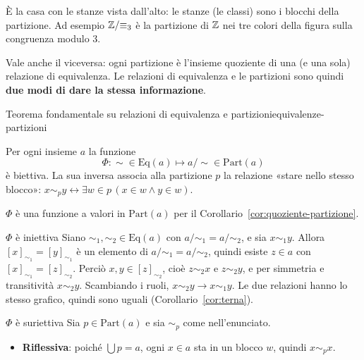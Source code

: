 \begin{spiegazione}
    È la casa con le stanze vista dall'alto: le stanze (le classi) sono i blocchi della partizione. Ad esempio $\mathbb{Z}/{\equiv_3}$
    è la partizione di $\mathbb{Z}$ nei tre colori della figura sulla congruenza modulo $3$.
\end{spiegazione}

Vale anche il viceversa: ogni partizione è l'insieme quoziente di una (e una sola) relazione di equivalenza. Le relazioni di
equivalenza e le partizioni sono quindi \textbf{due modi di dare la stessa informazione}.

\begin{concetto}
\begin{Teorema}{Teorema fondamentale su relazioni di equivalenza e partizioni}{equivalenze-partizioni}
    \begin{prerequisiti}
    \end{prerequisiti}
    Per ogni insieme $a$ la funzione
    \[ \Phi \colon {\sim} \in \mathrm{Eq}(a) \mapsto a/{\sim} \in \mathrm{Part}(a) \]
    è biettiva. La sua inversa associa alla partizione $p$ la relazione «stare nello stesso blocco»:
    $x \sim_p y \leftrightarrow \exists w \in p\,(x \in w \wedge y \in w)$.
\end{Teorema}
\begin{dimostrazione}
    $\Phi$ è una funzione a valori in $\mathrm{Part}(a)$ per il Corollario~\ref{cor:quoziente-partizione}.
    \begin{caso}{$\Phi$ è iniettiva}
        Siano $\sim_1, \sim_2 \in \mathrm{Eq}(a)$ con $a/{\sim_1} = a/{\sim_2}$, e sia $x \sim_1 y$. Allora $[x]_{\sim_1} = [y]_{\sim_1}$
        è un elemento di $a/{\sim_1} = a/{\sim_2}$, quindi esiste $z \in a$ con $[x]_{\sim_1} = [z]_{\sim_2}$. Perciò $x, y \in [z]_{\sim_2}$,
        cioè $z \sim_2 x$ e $z \sim_2 y$, e per simmetria e transitività $x \sim_2 y$. Scambiando i ruoli, $x \sim_2 y \rightarrow x \sim_1 y$.
        Le due relazioni hanno lo stesso grafico, quindi sono uguali (Corollario~\ref{cor:terna}).
    \end{caso}
    \begin{caso}{$\Phi$ è suriettiva}
        Sia $p \in \mathrm{Part}(a)$ e sia $\sim_p$ come nell'enunciato.
        \begin{itemize}
            \item[] \textbf{Riflessiva}: poiché $\bigcup p = a$, ogni $x \in a$ sta in un blocco $w$, quindi $x \sim_p x$.

\end{itemize}
\end{caso}
\end{dimostrazione}
\end{concetto}
